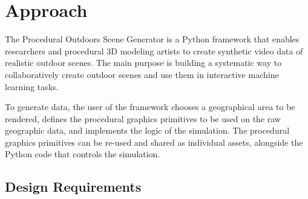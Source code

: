 \chapter{Approach}
\label{chapter:approach}


The Procedural Outdoors Scene Generator is a Python framework that enables researchers and procedural 3D modeling artists to create synthetic video data of realistic outdoor scenes. The main purpose is building a systematic way to collaboratively create outdoor scenes and use them in interactive machine learning tasks.


To generate data, the user of the framework chooses a geographical area to be rendered, defines the procedural graphics primitives to be used on the raw geographic data, and implements the logic of the simulation. The procedural graphics primitives can be re-used and shared as individual assets, alongside the Python code that controls the simulation.

\section{Design Requirements}
\label{sec:design-requirements}


